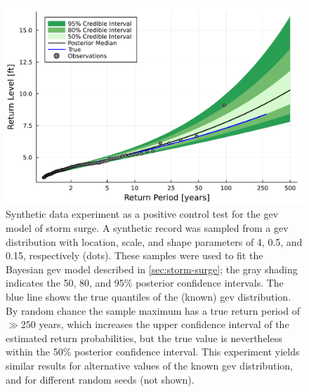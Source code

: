 \documentclass[12pt]{article}
\begin{document}
\begin{figure}
    \centering
    \includegraphics[width=\textwidth]{surge-synthetic-data-experiment}
    \caption{
        Synthetic data experiment as a positive control test for the \gls{gev} model of storm surge.
        A synthetic record was sampled from a \gls{gev} distribution with location, scale, and shape parameters of 4, 0.5, and 0.15, respectively (dots).
        These samples were used to fit the Bayesian \gls{gev} model described in \cref{sec:storm-surge}; the gray shading indicates the 50, 80, and 95\% posterior confidence intervals.
        The blue line shows the true quantiles of the (known) \gls{gev} distribution.
        By random chance the sample maximum has a true return period of $\gg 250$ years, which increases the upper confidence interval of the estimated return probabilities, but the true value is nevertheless within the 50\% posterior confidence interval.
        This experiment yields similar results for alternative values of the known \gls{gev} distribution, and for different random seeds (not shown).
    }\label{fig:surge-synthetic-data-experiment}
\end{figure}
\end{document}
